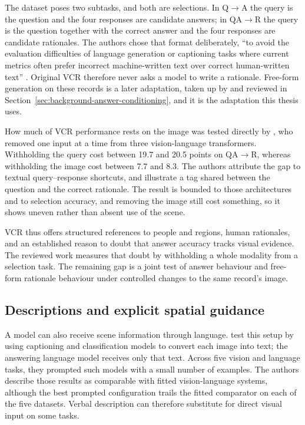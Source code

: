 The dataset poses two subtasks, and both are selections. In \mbox{Q$\rightarrow$A}
the query is the question and the four responses are candidate answers; in
\mbox{QA$\rightarrow$R} the query is the question together with the correct answer
and the four responses are candidate rationales. The authors chose that format
deliberately, \enquote{to avoid the evaluation difficulties of language generation
or captioning tasks where current metrics often prefer incorrect machine-written
text over correct human-written text}
\citep{DBLP:conf/cvpr/ZellersBFC19}. Original VCR therefore never asks a model to
write a rationale. Free-form generation on these records is a later adaptation,
taken up by \citet{DBLP:conf/emnlp/MarasovicBPLSC20} and reviewed in
Section~\ref{sec:background-answer-conditioning}, and it is the adaptation this
thesis uses.

How much of VCR performance rests on the image was tested directly by
\citet{LiGWCNK24}, who removed one input at a time from three vision-language
transformers. Withholding the query cost between 19.7 and 20.5 points on
\mbox{QA$\rightarrow$R}, whereas withholding the image cost between 7.7 and 8.3.
The authors attribute the gap to textual query--response shortcuts, and
illustrate a tag shared between the question and the correct rationale. The
result is bounded to those
architectures and to selection accuracy, and removing the image still cost
something, so it shows uneven rather than absent use of the scene.

VCR thus offers structured references to people and regions, human rationales, and
an established reason to doubt that answer accuracy tracks visual evidence. The
reviewed work measures that doubt by withholding a whole modality from a selection
task. The remaining gap is a joint test of answer behaviour and free-form
rationale behaviour under controlled changes to the same record's image.

\subsection{Descriptions and explicit spatial guidance}
\label{sec:background-descriptions}

A model can also receive scene information through language.
\citet{HakimovS23} test this setup by using captioning and classification models
to convert each image into text; the answering language model receives only that
text. Across five vision and language tasks, they prompted such models with a
small number of examples. The authors describe those results as comparable with
fitted \mbox{vision-language} systems, although the best prompted configuration
trails the fitted comparator on each of the five datasets. Verbal description can
therefore substitute for direct visual input on some tasks.

